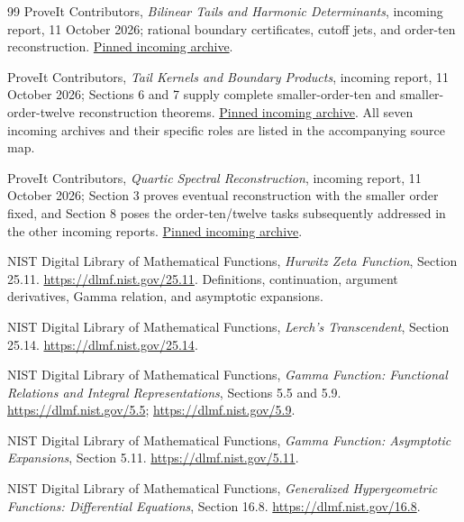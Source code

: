 \documentclass[11pt,a4paper]{article}
\numberwithin{equation}{section}
\theoremstyle{definition}
\theoremstyle{remark}
\begin{document}
\begin{thebibliography}{99}
ProveIt Contributors,
\emph{Bilinear Tails and Harmonic Determinants}, incoming report,
11 October 2026; rational boundary certificates, cutoff jets,
and order-ten reconstruction.
\href{https://github.com/VladimirReshetnikov/ProveIt/blob/e3d7ec5d3f9be259c1f91edaea4389f4e79b5b03/docs/incoming/ProveIt_Bilinear_Tails_and_Determinants_2026-10-11.zip}{Pinned incoming archive}.

ProveIt Contributors,
\emph{Tail Kernels and Boundary Products}, incoming report,
11 October 2026; Sections 6 and 7 supply complete smaller-order-ten
and smaller-order-twelve reconstruction theorems.
\href{https://github.com/VladimirReshetnikov/ProveIt/blob/e3d7ec5d3f9be259c1f91edaea4389f4e79b5b03/docs/incoming/ProveIt_Tail_Kernels_and_Boundary_Products_2026-10-11.zip}{Pinned incoming archive}.
All seven incoming archives and their specific roles are listed in
the accompanying source map.

ProveIt Contributors,
\emph{Quartic Spectral Reconstruction}, incoming report,
11 October 2026; Section 3 proves eventual reconstruction with the
smaller order fixed, and Section 8 poses the order-ten/twelve tasks
subsequently addressed in the other incoming reports.
\href{https://github.com/VladimirReshetnikov/ProveIt/blob/e3d7ec5d3f9be259c1f91edaea4389f4e79b5b03/docs/incoming/ProveIt_Quartic_Spectral_Reconstruction_2026-10-11.zip}{Pinned incoming archive}.

NIST Digital Library of Mathematical Functions,
\emph{Hurwitz Zeta Function}, Section 25.11.
\url{https://dlmf.nist.gov/25.11}.
Definitions, continuation, argument derivatives, Gamma relation,
and asymptotic expansions.

NIST Digital Library of Mathematical Functions,
\emph{Lerch's Transcendent}, Section 25.14.
\url{https://dlmf.nist.gov/25.14}.

NIST Digital Library of Mathematical Functions,
\emph{Gamma Function: Functional Relations and Integral Representations},
Sections 5.5 and 5.9.
\url{https://dlmf.nist.gov/5.5};
\url{https://dlmf.nist.gov/5.9}.

NIST Digital Library of Mathematical Functions,
\emph{Gamma Function: Asymptotic Expansions}, Section 5.11.
\url{https://dlmf.nist.gov/5.11}.

NIST Digital Library of Mathematical Functions,
\emph{Generalized Hypergeometric Functions: Differential Equations},
Section 16.8.
\url{https://dlmf.nist.gov/16.8}.


\end{thebibliography}
\end{document}
